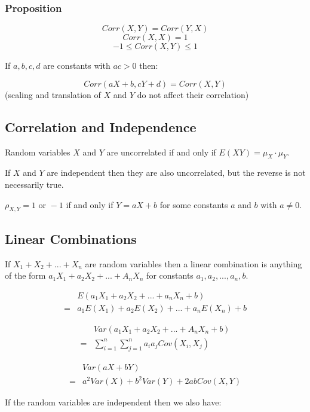 \subsubsection{Proposition}

$$ Corr(X,Y) = Corr(Y,X) $$
$$ Corr(X,X) = 1 $$
$$ -1 \leq Corr(X,Y) \leq 1 $$

If $a,b,c,d$ are constants with $ac>0$ then:

$$ Corr(aX+b, cY+d) = Corr(X,Y) $$
(scaling and translation of $X$ and $Y$ do not affect their correlation)

\subsection{Correlation and Independence}

Random variables $X$ and $Y$ are uncorrelated if and only if $E(XY)=\mu_X\cdot \mu_Y$.

If $X$ and $Y$ are independent then they are  also uncorrelated, but the reverse is not necessarily true.

$\rho_{X,Y} = 1 \text{ or } -1$ if and only if $Y=aX+b$ for some constants $a$ and $b$ with $a\neq 0$.

\subsection{Linear Combinations}

If $X_1+X_2+...+X_n$ are random variables then a linear combination is anything of the form $a_1X_1+a_2X_2+...+A_nX_n$ for constants $a_1,a_2,...,a_n,b$.

\begin{align*}
      & E(a_1X_1+a_2X_2+...+a_nX_n+b)       \\
    = & a_1E(X_1)+a_2E(X_2)+...+a_nE(X_n)+b
\end{align*}

\begin{align*}
      & Var(a_1X_1+a_2X_2+...+A_nX_n+b)                \\
    = & \sum_{i=1}^n \sum_{j=1}^n a_i a_j Cov(X_i,X_j)
\end{align*}

\begin{align*}
      & Var(aX+bY)                             \\
    = & a^2 Var(X) + b^2 Var(Y) + 2ab Cov(X,Y)
\end{align*}

If the random variables are independent then we also have:

